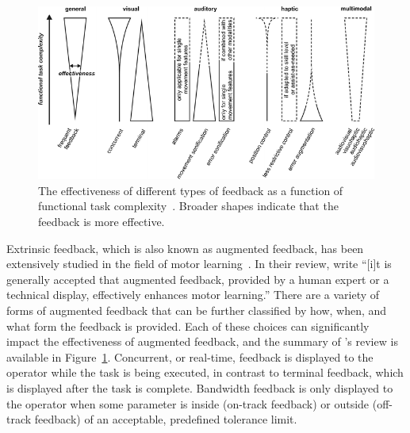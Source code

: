 \begin{figure}[!b]
    \begin{center}
        \includegraphics[width=\linewidth]{figures/Introduction/sigrist_review.png}
        \caption[The effectiveness of different types of feedback as a function of functional task complexity]{The effectiveness of different types of feedback as a function of functional task complexity~\citep{sigrist_augmented_2013}. Broader shapes indicate that the feedback is more effective.}
        \label{figure:sigrist_review}
    \end{center}
\end{figure}

Extrinsic feedback, which is also known as augmented feedback, has been extensively studied in the field of motor learning~\citep{sigrist_augmented_2013}.
In their \citeyear{sigrist_augmented_2013} review, \citeauthor{sigrist_augmented_2013} write ``[i]t is generally accepted that augmented feedback, provided by a human expert or a technical display, effectively enhances motor learning.''
There are a variety of forms of augmented feedback that can be further classified by how, when, and what form the feedback is provided.
Each of these choices can significantly impact the effectiveness of augmented feedback, and the summary of \citeauthor{sigrist_augmented_2013}'s review is available in Figure~\ref{figure:sigrist_review}.
Concurrent, or real-time, feedback is displayed to the operator while the task is being executed, in contrast to terminal feedback, which is displayed after the task is complete.
Bandwidth feedback is only displayed to the operator when some parameter is inside (on-track feedback) or outside (off-track feedback) of an acceptable, predefined tolerance limit.

